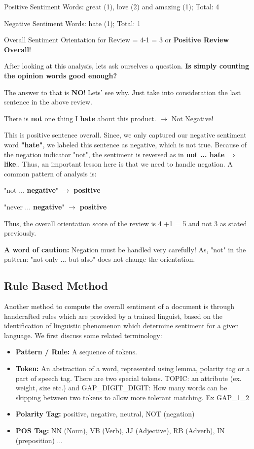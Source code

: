 Positive Sentiment Words: great (1), love (2) and amazing (1); Total: 4

Negative Sentiment Words: hate (1); Total: 1
\newline 

Overall Sentiment Orientation for Review = 4-1 = 3 or \textbf{Positive Review Overall}!

After looking at this analysis, lets ask ourselves a question. \textbf{Is simply counting the opinion words good enough?}

The answer to that is \textbf{NO}! Lets' see why. Just take into consideration the last sentence in the above review. 

There is \textbf{not} one thing I \textbf{hate} about this product. $\rightarrow$ Not Negative!
\newline

This is positive sentence overall. Since, we only captured our negative sentiment word \textbf{"hate"}, we labeled this sentence as negative, which is not true. Because of the negation indicator "not", the sentiment is reversed as in  \textbf{not ... hate} $\Rightarrow$ \textbf{like}.. Thus, an important lesson here is that we need to handle negation.  A common pattern of analysis is:
\newline

"not ... \textbf{negative}" $\rightarrow$ \textbf{positive}

"never ... \textbf{negative}" $\rightarrow$ \textbf{positive}
\newline

Thus, the overall orientation score of the review is 4 +1 = 5 and not 3 as stated previously.
\newline

\textbf{A word of caution:} Negation must be handled very carefully! As, "not" in the pattern: "not only ... but also" does not change the orientation. 

\subsection{Rule Based Method}

Another method to compute the overall sentiment of a document is through handcrafted rules which are provided by a trained linguist, based on the identification of linguistic phenomenon which determine sentiment for a given language. We first discuss some related terminology:
\begin{itemize}
\item \textbf{Pattern / Rule:} A sequence of tokens.
\item \textbf{Token:} An abstraction of a word, represented using lemma, polarity tag or a part of speech tag. There are two special tokens. TOPIC: an attribute (ex. weight, size etc.) and GAP\_DIGIT\_DIGIT: How many words can be skipping between two tokens to allow more tolerant matching. Ex GAP\_1\_2 
\item \textbf{Polarity Tag:} positive, negative, neutral, NOT (negation)
\item \textbf{POS Tag:} NN (Noun), VB (Verb), JJ (Adjective), RB (Adverb), IN (preposition) ...
\end{itemize}

